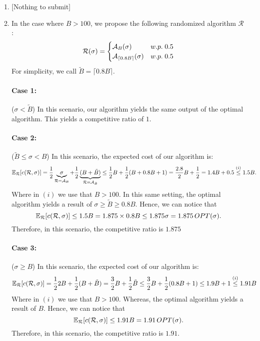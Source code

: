 \documentclass[11pt]{article}
\begin{document}
\begin{enumerate}
    \item {}[Nothing to submit]
    \item In the case where $B > 100$, we propose the following randomized algorithm $\mathcal{R}
    $:
    \begin{equation*}
        \mathcal{R}(\sigma) = \begin{cases}
            \mathcal{A}_B(\sigma)& w.p. \;0.5\\
            \mathcal{A}_{\lceil 0.8B\rceil}(\sigma)& w.p. \;0.5\\
        \end{cases}
    \end{equation*}
    For simplicity, we call $\tilde B = \lceil 0.8B\rceil$.
    \paragraph{Case 1:} ($\sigma < \tilde B $) In this scenario, our algorithm yields the same output of the optimal algorithm. This yields a competitive ratio of $1$.
    \paragraph{Case 2:} ($\tilde B \leq \sigma < B$) In this scenario, the expected cost of our algorithm is:
    \begin{equation*}
        \mathbb{E}_{\mathcal R}[c(\mathcal{R},\sigma)] =\frac{1}{2}\underbrace{\sigma}_{\mathcal R = \mathcal{A}_B} + \frac{1}{2}\underbrace{(B+\tilde B)}_{\mathcal R = \mathcal{A}_{\tilde{B}}}  \leq \frac{1}{2}B + \frac{1}{2}(B + 0.8B + 1) = \frac{2.8}{2}B + \frac{1}{2} = 1.4B + 0.5 \stackrel{(i)}{\leq} 1.5B.
    \end{equation*}
    Where in $(i)$ we use that $B > 100$. In this same setting, the optimal algorithm yields a result of $\sigma\geq \tilde B \geq 0.8B$. Hence, we can notice that
    \begin{equation*}
        \mathbb{E}_{\mathcal R}[c(\mathcal{R},\sigma)] \leq 1.5B = 1.875 \times 0.8B\leq 1.875 \sigma = 1.875 \,OPT(\sigma).
    \end{equation*}
    Therefore, in this scenario, the competitive ratio is $1.875$
    \paragraph{Case 3:} ($\sigma \geq B$) In this scenario, the expected cost of our algorithm is:
    \begin{equation*}
        \mathbb{E}_{\mathcal R}[c(\mathcal{R},\sigma)] =\frac{1}{2}2B + \frac{1}{2}(B + \tilde B) = \frac{3}{2}B + \frac{1}{2}\tilde B \leq \frac{3}{2}B + \frac{1}{2}(0.8B +1) \leq 1.9B + 1 \stackrel{(i)}{\leq} 1.91B
    \end{equation*}
    Where in $(i)$ we use that $B > 100$. Whereas, the optimal algorithm yields a result of $B$. Hence, we can notice that
    \begin{equation*}
        \mathbb{E}_{\mathcal R}[c(\mathcal{R},\sigma)]  \leq 1.91B = 1.91\,OPT(\sigma).
    \end{equation*}
    Therefore, in this scenario, the competitive ratio is $1.91$.

\end{enumerate}
\end{document}

